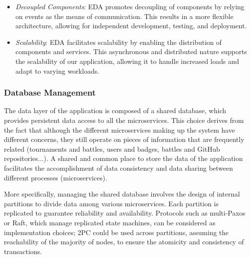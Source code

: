 \begin{itemize}
    \item \textit{Decoupled Components}: EDA promotes decoupling of components by relying on events as the means of communication. This results in a more flexible architecture, allowing for independent development, testing, and deployment.
  
    \item \textit{Scalability}: EDA facilitates scalability by enabling the distribution of components and services. This asynchronous and distributed nature supports the scalability of our application, allowing it to handle increased loads and adapt to varying workloads.
 
\end{itemize}


\subsubsection{Database Management}

The data layer of the \app application is composed of a shared database, which provides persistent data access to all the microservices. This choice derives from the fact that although the different microservices making up the \app system have different concerns, they still operate on pieces of information that are frequently related (tournaments and battles, users and badges, battles and GitHub repositories...). A shared and common place to store the data of the application facilitates the accomplishment of data consistency and data sharing between different processes (microservices).

More specifically, managing the shared database involves the design of internal partitions to divide data among various microservices. Each partition is replicated to guarantee reliability and availability. Protocols such as multi-Paxos or Raft, which manage replicated state machines, can be considered as implementation choices; 2PC could be used across partitions, assuming the reachability of the majority of nodes, to ensure the atomicity and consistency of transactions.

